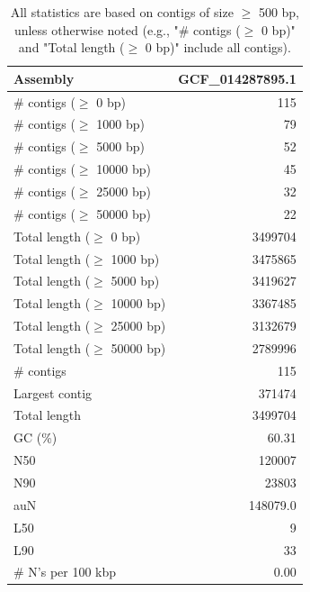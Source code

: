 \documentclass[12pt,a4paper]{article}
\begin{document}
\begin{table}[ht]
\begin{center}
\caption{All statistics are based on contigs of size $\geq$ 500 bp, unless otherwise noted (e.g., "\# contigs ($\geq$ 0 bp)" and "Total length ($\geq$ 0 bp)" include all contigs).}
\begin{tabular}{|l*{1}{|r}|}
\hline
Assembly & GCF\_014287895.1 \\ \hline
\# contigs ($\geq$ 0 bp) & 115 \\ \hline
\# contigs ($\geq$ 1000 bp) & 79 \\ \hline
\# contigs ($\geq$ 5000 bp) & 52 \\ \hline
\# contigs ($\geq$ 10000 bp) & 45 \\ \hline
\# contigs ($\geq$ 25000 bp) & 32 \\ \hline
\# contigs ($\geq$ 50000 bp) & 22 \\ \hline
Total length ($\geq$ 0 bp) & 3499704 \\ \hline
Total length ($\geq$ 1000 bp) & 3475865 \\ \hline
Total length ($\geq$ 5000 bp) & 3419627 \\ \hline
Total length ($\geq$ 10000 bp) & 3367485 \\ \hline
Total length ($\geq$ 25000 bp) & 3132679 \\ \hline
Total length ($\geq$ 50000 bp) & 2789996 \\ \hline
\# contigs & 115 \\ \hline
Largest contig & 371474 \\ \hline
Total length & 3499704 \\ \hline
GC (\%) & 60.31 \\ \hline
N50 & 120007 \\ \hline
N90 & 23803 \\ \hline
auN & 148079.0 \\ \hline
L50 & 9 \\ \hline
L90 & 33 \\ \hline
\# N's per 100 kbp & 0.00 \\ \hline
\end{tabular}
\end{center}
\end{table}
\end{document}
